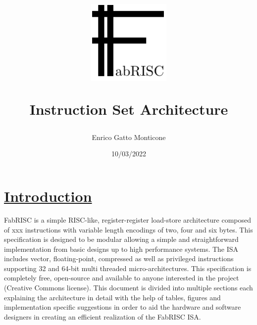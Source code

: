 \documentclass{article}
\title{\includegraphics[width=4cm]{LOGO.pdf} \par\noindent\huge{Instruction Set Architecture}}
\date{10/03/2022}
\author{Enrico Gatto Monticone}
\begin{document}
	\maketitle
	\newpage

	\tableofcontents
	\listoffigures
	\newpage

    \section[Introduction]{\LARGE\underline{Introduction}}

        FabRISC is a simple RISC-like, register-register load-store architecture composed of xxx instructions with variable length encodings of two, four and six bytes. This specification is designed to be modular allowing a simple and straightforward implementation from basic designs up to high performance systems. The ISA includes vector, floating-point, compressed as well as privileged instructions supporting 32 and 64-bit multi threaded micro-architectures. This specification is completely free, open-source and available to anyone interested in the project (Creative Commons license). This document is divided into multiple sections each explaining the architecture in detail with the help of tables, figures and implementation specific suggestions in order to aid the hardware and software designers in creating an efficient realization of the FabRISC ISA.
\end{document}
